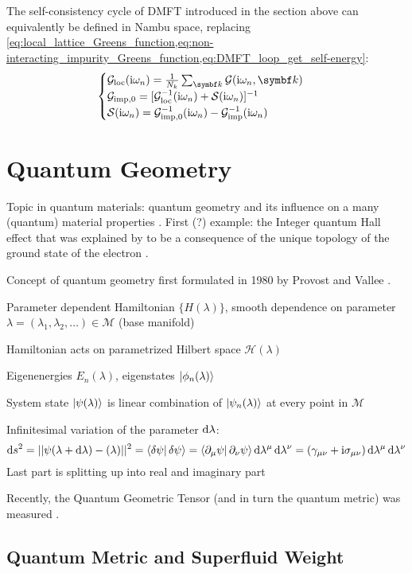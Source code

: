 \documentclass[../notes.tex]{subfiles}
\begin{document}
The self-consistency cycle of DMFT introduced in the section above can equivalently be defined in Nambu space, replacing \cref{eq:local_lattice_Greens_function,eq:non-interacting_impurity_Greens_function,eq:DMFT_loop_get_self-energy}:
\begin{align}
	\begin{cases}
		\mathcal{G}_{\mathrm{loc}} (\iu \omega_n) = \frac{1}{N_k} \sum_{\vb{k}} \mathcal{G} (\iu \omega_n, \vb{k}) \\
		\mathcal{G}_{\mathrm{imp}, 0} = [\mathcal{G}_{\mathrm{loc}}^{-1} (\iu \omega_n) + \mathcal{S} (\iu \omega_n)]^{-1} \\
		\mathcal{S} (\iu \omega_n) = \mathcal{G}_{\mathrm{imp}, 0}^{-1} (\iu \omega_n) - \mathcal{G}_{\mathrm{imp}}^{-1} (\iu \omega_n)
	\end{cases}
\end{align}

\section{Quantum Geometry}\label{sec:quantum-metric}

Topic in quantum materials: quantum geometry and its influence on a many (quantum) material properties \cite{yuQuantumGeometryQuantum2024}.
First (?) example: the Integer quantum Hall effect \cite{klitzingNewMethodHighAccuracy1980} that was explained by \citeauthor{thoulessQuantizedHallConductance1982} to be a consequence of the unique topology of the ground state of the electron \cite{thoulessQuantizedHallConductance1982}.

Concept of quantum geometry first formulated in 1980 by Provost and Vallee \cite{provostRiemannianStructureManifolds1980}.

Parameter dependent Hamiltonian \(\{H(\lambda)\}\), smooth dependence on parameter \(\lambda = (\lambda_1, \lambda_2, \ldots) \in \mathcal{M}\) (base manifold)

Hamiltonian acts on parametrized Hilbert space \(\mathcal{H} (\lambda)\)

Eigenenergies \(E_n (\lambda)\), eigenstates \(\ket{\phi_n (\lambda)}\)

System state \(\ket{\psi (\lambda)}\) is linear combination of \(\ket{\psi_n (\lambda)}\) at every point in \(\mathcal{M}\)

Infinitesimal variation of the parameter \(\odif{\lambda}\):
\begin{equation}
	\odif{s^2} = \vert\vert \psi (\lambda + \odif{\lambda}) - \si (\lambda) \vert \vert^2 = \braket{\fdif{\psi} | \fdif{\psi}} = \braket{\pdif{\mu} \psi | \pdif{\nu} \psi} \odif{\lambda^{\mu}} \odif{\lambda^{\nu}} = (\gamma_{\mu \nu} + \iu \sigma_{\mu \nu}) \odif{\lambda^{\mu}} \odif{\lambda^{\nu}}
\end{equation}
Last part is splitting up into real and imaginary part

Recently, the Quantum Geometric Tensor (and in turn the quantum metric) was measured \cite{kangMeasurementsQuantumGeometric2025}.

\subsection*{Quantum Metric and Superfluid Weight}

\end{document}

